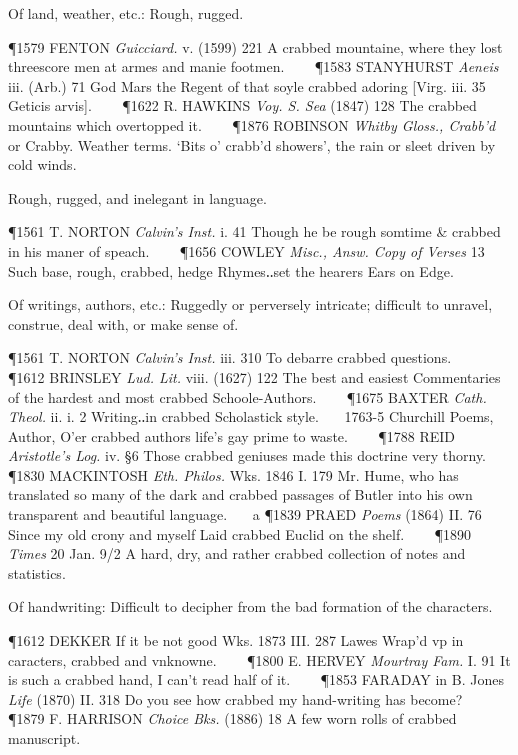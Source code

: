 \begin{description}[wide, labelwidth=!, labelindent=0pt]
\begin{myenumerate}
 Of land, weather, etc.: Rough, rugged.

\P 1579 FENTON  \textit{Guicciard.} v. (1599) 221 A crabbed mountaine, where they lost threescore men at armes and manie footmen.    
\P 1583 STANYHURST  \textit{Aeneis} iii. (Arb.) 71 God Mars the Regent of that soyle crabbed adoring [Virg. iii. 35 Geticis arvis].    
\P 1622 R. HAWKINS  \textit{Voy. S. Sea} (1847) 128 The crabbed mountains which overtopped it.    
\P 1876 ROBINSON  \textit{Whitby Gloss., Crabb'd} or Crabby. Weather terms. ‘Bits o' crabb'd showers’, the rain or sleet driven by cold winds.

 Rough, rugged, and inelegant in language.

\P 1561 T. NORTON  \textit{Calvin's Inst.} i. 41 Though he be rough somtime \& crabbed in his maner of speach.    
\P 1656 COWLEY  \textit{Misc., Answ. Copy of Verses} 13 Such base, rough, crabbed, hedge Rhymes‥set the hearers Ears on Edge.

 Of writings, authors, etc.: Ruggedly or perversely intricate; difficult to unravel, construe, deal with, or make sense of.

\P 1561 T. NORTON  \textit{Calvin's Inst.} iii. 310 To debarre crabbed questions.    
\P 1612 BRINSLEY  \textit{Lud. Lit.} viii. (1627) 122 The best and easiest Commentaries of the hardest and most crabbed Schoole-Authors.    
\P 1675 BAXTER  \textit{Cath. Theol.} ii. i. 2 Writing‥in crabbed Scholastick style.    1763-5 Churchill Poems, Author, O'er crabbed authors life's gay prime to waste.    
\P 1788 REID  \textit{Aristotle's Log.} iv. §6 Those crabbed geniuses made this doctrine very thorny.    
\P 1830 MACKINTOSH  \textit{Eth. Philos.} Wks. 1846 I. 179  Mr. Hume, who has translated so many of the dark and crabbed passages of Butler into his own transparent and beautiful language.    a 
\P 1839 PRAED  \textit{Poems} (1864) II. 76 Since my old crony and myself Laid crabbed Euclid on the shelf.    
\P 1890  \textit{Times} 20 Jan. 9/2 A hard, dry, and rather crabbed collection of notes and statistics.

 Of handwriting: Difficult to decipher from the bad formation of the characters.

\P 1612 DEKKER  If it be not good Wks. 1873 III.  287 Lawes Wrap'd vp in caracters, crabbed and vnknowne.    
\P 1800 E. HERVEY  \textit{Mourtray Fam.} I. 91 It is such a crabbed hand, I can't read half of it.    
\P 1853 FARADAY in  B. Jones \textit{Life} (1870) II. 318 Do you see how crabbed my hand-writing has become?    
\P 1879 F. HARRISON  \textit{Choice Bks.} (1886) 18 A few worn rolls of crabbed manuscript.


\end{myenumerate}
\end{description}
